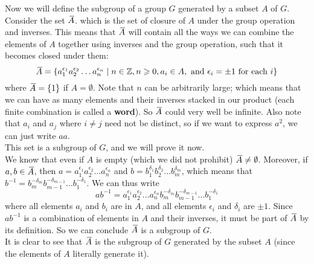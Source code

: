 \documentclass[12pt]{article}
\begin{document}
    Now we will define
    the subgroup of a group $G$ generated by a subset $A$ of $G$.
    Consider the set $\,\overline{\!{A}}$.
    which is the set of closure of $A$
    under the group operation and inverses.
    This means that $\,\overline{\!{A}}$ will contain
    all the ways we can combine the elements of $A$
    together using inverses and the group operation,
    such that it becomes closed under them:
    \[ \,\overline{\!{A}} =
    \{ a_1^{\epsilon_1}a_2^{\epsilon_2} \dots a_n^{\epsilon_n} \mid
    n \in \mathbb{Z}, n \geqslant 0, a_i \in A,
    \text{ and } \epsilon_i = \pm 1 \text { for each } i  \} \]
    where $\,\overline{\!{A}} = \{1\}$ if $A = \emptyset$.
    Note that $n$ can be arbitrarily large;
    which means that we can have as many elements 
    and their inverses stacked in our product
    (each finite combination is called a \textbf{word}).
    So $\,\overline{\!{A}}$ could very well be infinite.
    Also note that $a_i$ and $a_j$ where $i \neq j$
    need not be distinct,
    so if we want to express $a^2$, we can just write $aa$. \\
    This set is a subgroup of $G$,
    and we will prove it now. \\
    We know that even if $A$ is empty
    (which we did not prohibit)
    $\,\overline{\!{A}} \neq \emptyset$.
    Moreover, if $a, b \in \,\overline{\!{A}}$,
    then $a = a_1^{\epsilon_1}a_2^{\epsilon_2} \dots a_n^{\epsilon_n}$
    and $b = b_1^{\delta_1}b_2^{\delta_2} \dots b_m^{\delta_m}$,
    which means that $b^{-1} = b_m^{-\delta_m}b_{m-1}^{-\delta_{m-1}}
    \dots b_1^{-\delta_1}$.
    We can thus write
    \[ ab^{-1} = 
    a_1^{\epsilon_1}a_2^{\epsilon_2} \dots a_n^{\epsilon_n}
    b_m^{-\delta_m}b_{m-1}^{-\delta_{m-1}} \dots b_1^{-\delta_1} \]
    where all elements $a_i$ and $b_i$ are in $A$,
    and all elements $\epsilon_i$ and $\delta_i$ are $\pm 1$.
    Since $ab^{-1}$ is a combination of elements in $A$
    and their inverses,
    it must be part of $\,\overline{\!{A}}$ by its definition.
    So we can conclude $\,\overline{\!{A}}$ is a subgroup of $G$. \\
    It is clear to see that $\,\overline{\!{A}}$
    is the subgroup of $G$ generated by the subset $A$
    (since the elements of $A$ literally generate it). \\
\end{document}
